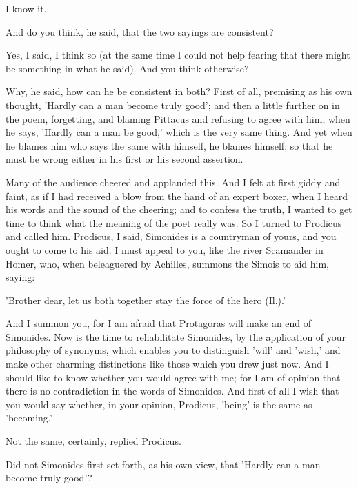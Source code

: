 \documentclass[11pt,letter]{article}
\begin{document}
\par  I know it.

\par  And do you think, he said, that the two sayings are consistent?

\par  Yes, I said, I think so (at the same time I could not help fearing that there might be something in what he said). And you think otherwise?

\par  Why, he said, how can he be consistent in both? First of all, premising as his own thought, 'Hardly can a man become truly good'; and then a little further on in the poem, forgetting, and blaming Pittacus and refusing to agree with him, when he says, 'Hardly can a man be good,' which is the very same thing. And yet when he blames him who says the same with himself, he blames himself; so that he must be wrong either in his first or his second assertion.

\par  Many of the audience cheered and applauded this. And I felt at first giddy and faint, as if I had received a blow from the hand of an expert boxer, when I heard his words and the sound of the cheering; and to confess the truth, I wanted to get time to think what the meaning of the poet really was. So I turned to Prodicus and called him. Prodicus, I said, Simonides is a countryman of yours, and you ought to come to his aid. I must appeal to you, like the river Scamander in Homer, who, when beleaguered by Achilles, summons the Simois to aid him, saying:

\par  'Brother dear, let us both together stay the force of the hero (Il.).'

\par  And I summon you, for I am afraid that Protagoras will make an end of Simonides. Now is the time to rehabilitate Simonides, by the application of your philosophy of synonyms, which enables you to distinguish 'will' and 'wish,' and make other charming distinctions like those which you drew just now. And I should like to know whether you would agree with me; for I am of opinion that there is no contradiction in the words of Simonides. And first of all I wish that you would say whether, in your opinion, Prodicus, 'being' is the same as 'becoming.'

\par  Not the same, certainly, replied Prodicus.

\par  Did not Simonides first set forth, as his own view, that 'Hardly can a man become truly good'?
\end{document}
